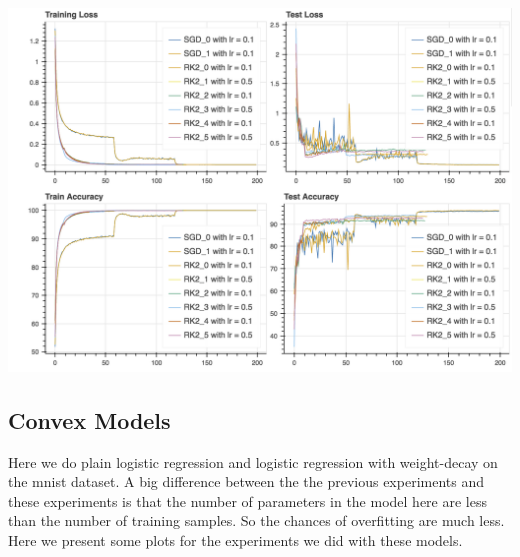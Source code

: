 \\
\includegraphics[scale=0.4]{plots/wideresnet.png}

\subsection{Convex Models}

Here we do plain logistic regression and logistic regression with weight-decay on the mnist dataset. A big difference between the the previous experiments and these experiments is that the number of parameters in the model here are less than the number of training samples. So the chances of overfitting are much less. Here we present some plots for the experiments we did with these models.

